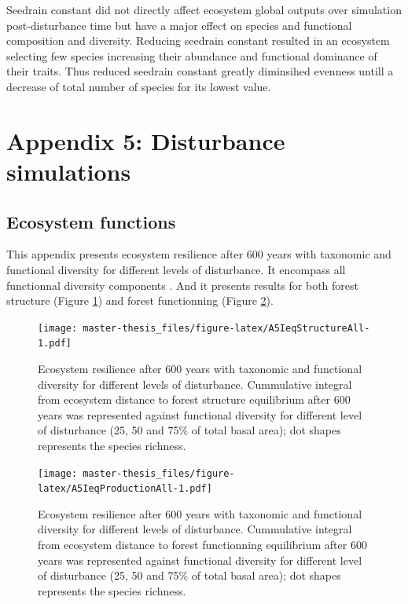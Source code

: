 \documentclass[12pt,]{article}
\let\oldsection\section
\renewcommand\section{\newpage\oldsection}
\theoremstyle{definition}
\theoremstyle{definition}
\theoremstyle{remark}
\begin{document}
Seedrain constant did not directly affect ecosystem global outputs over
simulation post-disturbance time but have a major effect on species and
functional composition and diversity. Reducing seedrain constant
resulted in an ecosystem selecting few species increasing their
abundance and functional dominance of their traits. Thus reduced
seedrain constant greatly diminsihed evenness untill a decrease of total
number of species for its lowest value.

\hypertarget{appendix-5-disturbance-simulations}{\section{Appendix 5:
Disturbance simulations}\label{appendix-5-disturbance-simulations}}

\subsection{Ecosystem functions}\label{ecosystem-functions-2}

This appendix presents ecosystem resilience after 600 years with
taxonomic and functional diversity for different levels of disturbance.
It encompass all functionnal diversity components \citep[FRIC, FEve,
FDiv, and FDis,][]{villeger_new_2008}. And it presents results for both
forest structure (Figure \ref{fig:A5IeqStructureAll}) and forest
functionning (Figure \ref{fig:A5IeqProductionAll}).

\begin{figure}[htbp]
\centering
\texttt{[image: master-thesis\_files/figure-latex/A5IeqStructureAll-1.pdf]}
\caption{\label{fig:A5IeqStructureAll}Ecosystem resilience after 600 years
with taxonomic and functional diversity for different levels of
disturbance. Cummulative integral from ecosystem distance to forest
structure equilibrium after 600 years was represented against functional
diversity \citep[FRIC, FEve, FDiv, and FDis,][]{villeger_new_2008} for
different level of disturbance (25, 50 and 75\% of total basal area);
dot shapes represents the species richness.}
\end{figure}

\begin{figure}[htbp]
\centering
\texttt{[image: master-thesis\_files/figure-latex/A5IeqProductionAll-1.pdf]}
\caption{\label{fig:A5IeqProductionAll}Ecosystem resilience after 600 years
with taxonomic and functional diversity for different levels of
disturbance. Cummulative integral from ecosystem distance to forest
functionning equilibrium after 600 years was represented against
functional diversity \citep[FRIC, FEve, FDiv, and
FDis,][]{villeger_new_2008} for different level of disturbance (25, 50
and 75\% of total basal area); dot shapes represents the species
richness.}
\end{figure}
\end{document}
